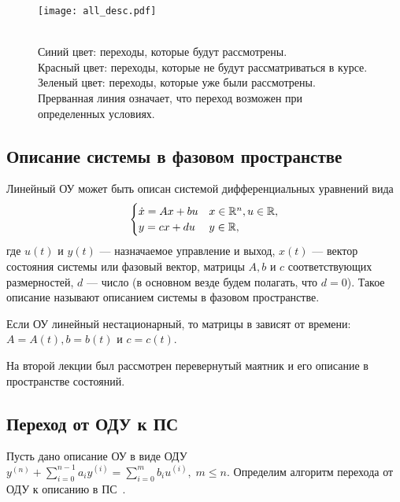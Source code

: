 \documentclass[../../TAU.tex]{subfiles}
\begin{document}
    \begin{figure}[!hb]
        \texttt{[image: all\_desc.pdf]}
        \caption
        {    
            {\\\color{blue} Синий цвет}: переходы, которые будут рассмотрены.\\
            {\color{red} Красный цвет}: переходы, которые не будут рассматриваться в курсе.\\
            {\color{green} Зеленый цвет}: переходы, которые уже были рассмотрены.\\
            Прерванная линия означает, что переход возможен при определенных условиях.
        }
    \end{figure}
\FloatBarrier

\subsection{Описание системы в фазовом пространстве}
    
    Линейный ОУ может быть описан системой дифференциальных уравнений вида
    \begin{equation}\label{ST_DS}
        \begin{cases}
            \dot x = Ax+bu& x\in\mathbb{R}^{n},u\in\mathbb{R},\\
            y = cx +d u& y\in\mathbb{R},
        \end{cases}
    \end{equation}
    где $u(t)$ и $y(t)$ --- назначаемое управление и выход, $x(t)$ --- вектор состояния системы или фазовый вектор, матрицы $A,b$ и $c$ соответствующих размерностей, $d$ --- число (в основном везде будем полагать, что $d=0$). Такое описание называют описанием системы в фазовом пространстве.

    Если ОУ линейный нестационарный, то матрицы в  зависят от времени: $A=A(t), b=b(t)$ и $c=c(t)$.

    На второй лекции был рассмотрен перевернутый маятник и его описание в пространстве состояний.

\subsection{Переход от ОДУ к ПС}

    Пусть дано описание ОУ в виде ОДУ  
    $y^{(n)}+\sum_{i=0}^{n-1}a_iy^{(i)}=\sum_{i=0}^{m}b_iu^{(i)},\; m \le n$. 
    Определим алгоритм перехода от ОДУ к описанию в ПС~.
\end{document}
